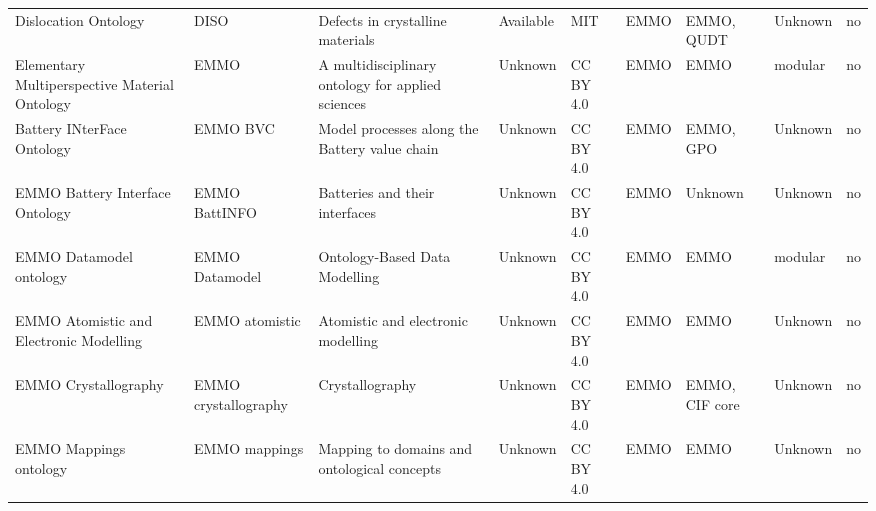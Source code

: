 \begin{table}
\begin{tabular}{m{5cm}m{2cm}m{5cm}m{2cm}m{2cm}m{2cm}m{2cm}m{2cm}m{2cm}}
                                        Dislocation Ontology &                    DISO &                                                  Defects in crystalline materials &            Available &         MIT  &                         EMMO &        EMMO, QUDT &    Unknown &               no \\
                        Elementary Multiperspective Material Ontology &                    EMMO &                                 A multidisciplinary ontology for applied sciences &              Unknown &    CC BY 4.0 &                         EMMO &              EMMO &    modular &               no \\
                                                       Battery INterFace Ontology &                EMMO BVC &                                     Model processes along the Battery value chain &              Unknown &    CC BY 4.0 &                         EMMO &         EMMO, GPO &    Unknown &               no \\
                                                  EMMO Battery Interface Ontology &           EMMO BattINFO &                                                    Batteries and their interfaces &              Unknown &    CC BY 4.0 &                         EMMO &           Unknown &    Unknown &               no \\
                                    EMMO Datamodel ontology &          EMMO Datamodel &                                                     Ontology-Based Data Modelling &              Unknown &    CC BY 4.0 &                         EMMO &              EMMO &    modular &               no \\
                                          EMMO Atomistic and Electronic Modelling &          EMMO atomistic &                                                Atomistic and electronic modelling &              Unknown &    CC BY 4.0 &                         EMMO &              EMMO &    Unknown &               no \\
                                                             EMMO Crystallography &    EMMO crystallography &                                                                   Crystallography &              Unknown &    CC BY 4.0 &                         EMMO &   EMMO, CIF core  &    Unknown &               no \\
                                                           EMMO Mappings ontology &           EMMO mappings &                                       Mapping to domains and ontological concepts &              Unknown &    CC BY 4.0 &                         EMMO &              EMMO &    Unknown &               no \\

\end{tabular}
\end{table}
